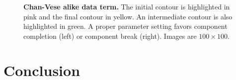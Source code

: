 \documentclass[smallextended]{svjour3}
\begin{document}
\begin{figure}
\center
{}\hspace{1em}%
%
\caption{\textbf{Chan-Vese alike data term.} The initial contour is highlighted in pink and the final contour in yellow. An intermediate contour is also highlighted in green. A proper parameter setting favors component completion (left) or component break (right). Images are $100\times100$. }
\label{fig:GF-chan-vese-alike}
\end{figure}



\section{Conclusion}
\end{document}

